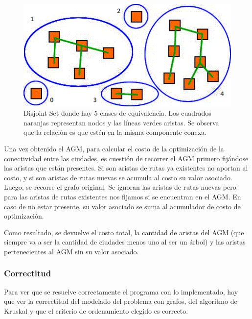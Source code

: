 \quad 


\begin{figure}[H]
	\centering
	\includegraphics[scale=0.8]{DisjointSets.png}
\caption{Disjoint Set donde hay 5 clases de equivalencia. Los cuadrados naranjas representan nodos y las l\'ineas verdes aristas. Se observa que la relaci\'on es que est\'en en la misma componente conexa.}
\end{figure}



\quad Una vez obtenido el AGM, para calcular el costo de la optimizaci\'on de la conectividad entre las ciudades, es cuesti\'on de recorrer el AGM primero fijándose las aristas que est\'an presentes. Si son aristas de rutas ya existentes no aportan al costo, y si son aristas de rutas nuevas se acumula al costo su valor asociado. Luego, se recorre el grafo original. Se ignoran las aristas de rutas nuevas pero para las aristas de rutas existentes nos fijamos si se encuentran en el AGM. En caso de no estar presente, su valor asociado se suma al acumulador de costo de optimizaci\'on.

\quad 

\quad Como resultado, se devuelve el costo total, la cantidad de aristas del AGM (que siempre va a ser la cantidad de ciudades menos uno al ser un \'arbol) y las aristas pertenecientes al AGM sin su valor asociado.

\subsubsection{Correctitud}

\quad Para ver que se resuelve correctamente el programa con lo implementado, hay que ver la correctitud del modelado del problema con grafos, del algoritmo de Kruskal y que el criterio de ordenamiento elegido es correcto.

